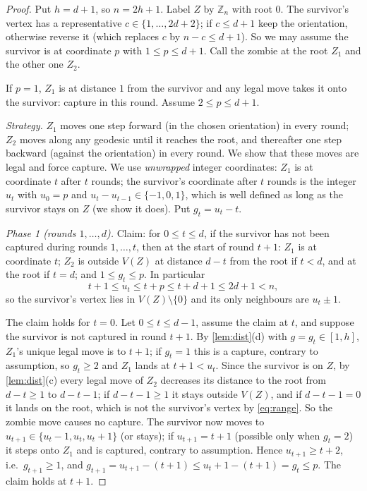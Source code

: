 \documentclass[11pt,a4paper]{article}
\theoremstyle{plain}
\theoremstyle{definition}
\theoremstyle{remark}
\newcommand{\Z}{\mathbb Z}
\begin{document}
\label{pf:cap}
\lemcap*
\begin{proof}
Put $h=d+1$, so $n=2h+1$. Label $Z$ by $\Z_n$ with root $0$. The survivor's vertex has a representative $c\in\{1,\dots,2d+2\}$; if $c\le d+1$ keep the orientation, otherwise reverse it (which replaces $c$ by $n-c\le d+1$). So we may assume the survivor is at coordinate $p$ with $1\le p\le d+1$. Call the zombie at the root $Z_1$ and the other one $Z_2$.

If $p=1$, $Z_1$ is at distance $1$ from the survivor and any legal move takes it onto the survivor: capture in this round. Assume $2\le p\le d+1$.

\emph{Strategy.} $Z_1$ moves one step forward (in the chosen orientation) in every round; $Z_2$ moves along any geodesic until it reaches the root, and thereafter one step backward (against the orientation) in every round. We show that these moves are legal and force capture. We use \emph{unwrapped} integer coordinates: $Z_1$ is at coordinate $t$ after $t$ rounds; the survivor's coordinate after $t$ rounds is the integer $u_t$ with $u_0=p$ and $u_t-u_{t-1}\in\{-1,0,1\}$, which is well defined as long as the survivor stays on $Z$ (we show it does). Put $g_t=u_t-t$.

\emph{Phase 1 (rounds $1,\dots,d$).} Claim: for $0\le t\le d$, if the survivor has not been captured during rounds $1,\dots,t$, then at the start of round $t+1$: $Z_1$ is at coordinate $t$; $Z_2$ is outside $V(Z)$ at distance $d-t$ from the root if $t<d$, and at the root if $t=d$; and $1\le g_t\le p$. In particular
\begin{equation}\label{eq:range}
t+1\le u_t\le t+p\le t+d+1\le 2d+1<n ,
\end{equation}
so the survivor's vertex lies in $V(Z)\setminus\{0\}$ and its only neighbours are $u_t\pm1$.

The claim holds for $t=0$. Let $0\le t\le d-1$, assume the claim at $t$, and suppose the survivor is not captured in round $t+1$. By \cref{lem:dist}(d) with $g=g_t\in[1,h]$, $Z_1$'s unique legal move is to $t+1$; if $g_t=1$ this is a capture, contrary to assumption, so $g_t\ge2$ and $Z_1$ lands at $t+1<u_t$. Since the survivor is on $Z$, by \cref{lem:dist}(c) every legal move of $Z_2$ decreases its distance to the root from $d-t\ge1$ to $d-t-1$; if $d-t-1\ge1$ it stays outside $V(Z)$, and if $d-t-1=0$ it lands on the root, which is not the survivor's vertex by \eqref{eq:range}. So the zombie move causes no capture. The survivor now moves to $u_{t+1}\in\{u_t-1,u_t,u_t+1\}$ (or stays); if $u_{t+1}=t+1$ (possible only when $g_t=2$) it steps onto $Z_1$ and is captured, contrary to assumption. Hence $u_{t+1}\ge t+2$, i.e.\ $g_{t+1}\ge1$, and $g_{t+1}=u_{t+1}-(t+1)\le u_t+1-(t+1)=g_t\le p$. The claim holds at $t+1$.


\end{proof}
\end{document}
